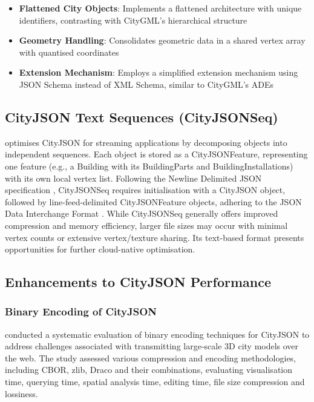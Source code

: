 \begin{itemize}
  \item \textbf{Flattened City Objects}: Implements a flattened architecture with unique identifiers, contrasting with CityGML's hierarchical structure
  \item \textbf{Geometry Handling}: Consolidates geometric data in a shared vertex array with quantised coordinates
  \item \textbf{Extension Mechanism}: Employs a simplified extension mechanism using JSON Schema instead of XML Schema, similar to CityGML's ADEs
\end{itemize}

\subsection{CityJSON Text Sequences (CityJSONSeq)}
\label{rw:cityjson_enhancements:cityjsonseq}
\citet{ledoux_2024} optimises CityJSON for streaming applications by decomposing objects into independent sequences. Each object is stored as a CityJSONFeature, representing one feature (e.g., a Building with its BuildingParts and BuildingInstallations) with its own local vertex list. Following the Newline Delimited JSON specification \citep{jsonnd}, CityJSONSeq requires initialisation with a CityJSON object, followed by line-feed-delimited CityJSONFeature objects, adhering to the JSON Data Interchange Format \citep{json_data_interchange_format}. While CityJSONSeq generally offers improved compression and memory efficiency, larger file sizes may occur with minimal vertex counts or extensive vertex/texture sharing. Its text-based format presents opportunities for further cloud-native optimisation.

\subsection{Enhancements to CityJSON Performance}
\label{rw:cityjson_enhancements:performance}
\subsubsection{Binary Encoding of CityJSON}
\label{rw:cityjson_enhancements:performance:binary_encoding}
\citet{jordi_van_liempt_2020} conducted a systematic evaluation of binary encoding techniques for CityJSON to address challenges associated with transmitting large-scale 3D city models over the web. The study assessed various compression and encoding methodologies, including CBOR, zlib, Draco and their combinations, evaluating visualisation time, querying time, spatial analysis time, editing time, file size compression and lossiness.

